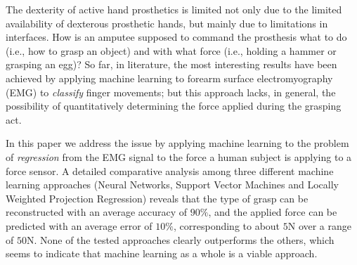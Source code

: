 The dexterity of active hand prosthetics is limited not only due
to the limited availability of dexterous prosthetic hands, but
mainly due to limitations in interfaces. How is an amputee
supposed to command the prosthesis what to do (i.e., how to grasp
an object) and with what force (i.e., holding a hammer or grasping
an egg)? So far, in literature, the most interesting results have
been achieved by applying machine learning to forearm surface
electromyography (EMG) to \emph{classify} finger movements; but
this approach lacks, in general, the possibility of quantitatively
determining the force applied during the grasping act.

In this paper we address the issue by applying machine learning to the
problem of \emph{regression} from the EMG signal to the force a human
subject is applying to a force sensor. A detailed comparative analysis
among three different machine learning approaches (Neural Networks,
Support Vector Machines and Locally Weighted Projection Regression)
reveals that the type of grasp can be reconstructed with an average
accuracy of $90\%$, and the applied force can be predicted with an
average error of $10\%$, corresponding to about $5$N over a range of
$50$N. None of the tested approaches clearly outperforms the others,
which seems to indicate that machine learning as a whole is a viable
approach.
%
